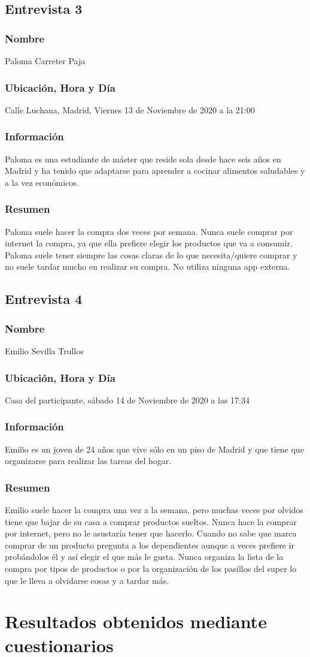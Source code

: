 \subsection{Entrevista 3}
\subsubsection{Nombre}
Paloma Carreter Paja
\subsubsection{Ubicación, Hora y Día}
Calle Luchana, Madrid, Viernes 13 de Noviembre de 2020 a la 21:00
\subsubsection{Información}
Paloma es una estudiante de máster que reside sola desde hace seis años en Madrid y ha tenido que adaptarse para aprender a cocinar alimentos saludables y a la vez económicos.
\subsubsection{Resumen}
Paloma suele hacer la compra dos veces por semana. Nunca suele comprar por internet la compra, ya que ella prefiere elegir los productos que va a consumir. Paloma suele tener siempre las cosas claras de lo que necesita/quiere comprar y no suele tardar mucho en realizar su compra. No utiliza ninguna app externa.

\subsection{Entrevista 4}
\subsubsection{Nombre}
Emilio Sevilla Trullos
\subsubsection{Ubicación, Hora y Día}
Casa del participante, sábado 14 de Noviembre de 2020 a las 17:34
\subsubsection{Información}
Emilio es un joven de 24 años que vive sólo en un piso de Madrid y que tiene que organizarse para realizar las tareas del hogar.
\subsubsection{Resumen}
Emilio suele hacer la compra una vez a la semana, pero muchas veces por olvidos tiene que bajar de su casa a comprar productos sueltos. Nunca hace la comprar por internet, pero no le asustaría tener que hacerlo. Cuando no sabe que marca comprar de un producto pregunta a los dependientes aunque a veces prefiere ir probándolos él y así elegir el que más le gusta. Nunca organiza la lista de la compra por tipos de productos o por la organización de los pasillos del super lo que le lleva a olvidarse cosas y a tardar más. 

\section{Resultados obtenidos mediante cuestionarios}

